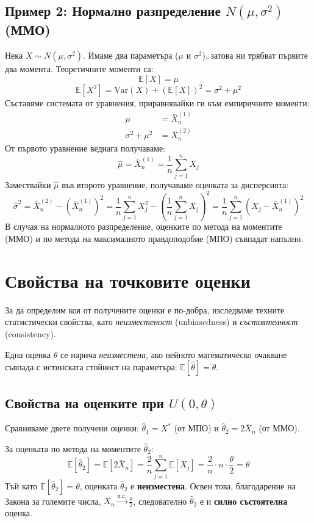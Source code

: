 \documentclass{article}
\begin{document}
\subsection{Пример 2: Нормално разпределение $N(\mu, \sigma^2)$ (ММО)}

Нека $X \sim N(\mu, \sigma^2)$. Имаме два параметъра ($\mu$ и $\sigma^2$), затова ни трябват първите два момента.
Теоретичните моменти са:
\[
    \mathbb{E}[X] = \mu
\]
\[
    \mathbb{E}[X^2] = \text{Var}(X) + (\mathbb{E}[X])^2 = \sigma^2 + \mu^2
\]
Съставяме системата от уравнения, приравнявайки ги към емпиричните моменти:
\begin{align*}
    \mu &= \bar{X}_n^{(1)} \\
    \sigma^2 + \mu^2 &= \bar{X}_n^{(2)}
\end{align*}
От първото уравнение веднага получаваме:
\[
    \hat{\mu} = \bar{X}_n^{(1)} = \frac{1}{n} \sum_{j=1}^n X_j
\]
Замествайки $\hat{\mu}$ във второто уравнение, получаваме оценката за дисперсията:
\[
    \hat{\sigma}^2 = \bar{X}_n^{(2)} - \left(\bar{X}_n^{(1)}\right)^2 = \frac{1}{n} \sum_{j=1}^n X_j^2 - \left(\frac{1}{n} \sum_{j=1}^n X_j\right)^2 = \frac{1}{n} \sum_{j=1}^n \left(X_j - \bar{X}_n^{(1)}\right)^2
\]
В случая на нормалното разпределение, оценките по метода на моментите (ММО) и по метода на максималното правдоподобие (МПО) съвпадат напълно.

\section{Свойства на точковите оценки}

За да определим коя от получените оценки е по-добра, изследваме техните статистически свойства, като \emph{неизместеност} (unbiasedness) и \emph{състоятелност} (consistency).

Една оценка $\hat{\theta}$ се нарича \emph{неизместена}, ако нейното математическо очакване съвпада с истинската стойност на параметъра: $\mathbb{E}[\hat{\theta}] = \theta$. 

\subsection{Свойства на оценките при $U(0, \theta)$}

Сравняваме двете получени оценки: $\hat{\theta}_1 = X^*$ (от МПО) и $\hat{\theta}_2 = 2 \bar{X}_n$ (от ММО).

За оценката по метода на моментите $\hat{\theta}_2$:
\[
    \mathbb{E}[\hat{\theta}_2] = \mathbb{E}[2 \bar{X}_n] = \frac{2}{n} \sum_{j=1}^n \mathbb{E}[X_j] = \frac{2}{n} \cdot n \cdot \frac{\theta}{2} = \theta
\]
Тъй като $\mathbb{E}[\hat{\theta}_2] = \theta$, оценката $\hat{\theta}_2$ е \textbf{неизместена}. Освен това, благодарение на Закона за големите числа, $\bar{X}_n \xrightarrow{\text{п.с.}} \frac{\theta}{2}$, следователно $\hat{\theta}_2$ е и \textbf{силно състоятелна} оценка.
\end{document}
